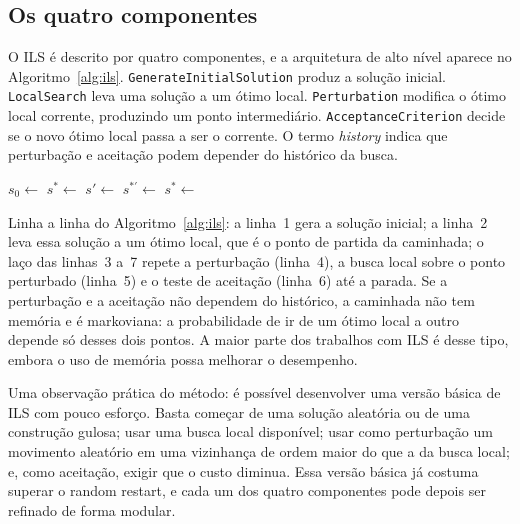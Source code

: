 \documentclass[11pt,a4paper]{article}
\newcommand{\code}[1]{\texttt{#1}}
\begin{document}
\subsection{Os quatro componentes}

O ILS é descrito por quatro componentes, e a arquitetura de alto nível aparece no Algoritmo~\ref{alg:ils}. \code{GenerateInitialSolution} produz a solução inicial. \code{LocalSearch} leva uma solução a um ótimo local. \code{Perturbation} modifica o ótimo local corrente, produzindo um ponto intermediário. \code{AcceptanceCriterion} decide se o novo ótimo local passa a ser o corrente. O termo \emph{history} indica que perturbação e aceitação podem depender do histórico da busca.

\begin{algorithm}[t]
\caption{Iterated Local Search (minimização)}
\label{alg:ils}
\begin{algorithmic}[1]
\State $s_0 \gets$ 
\State $s^\ast \gets$ 
\Repeat
  \State $s' \gets$ 
  \State $s^{\ast\prime} \gets$ 
  \State $s^\ast \gets$ 
\end{algorithmic}
\end{algorithm}

Linha a linha do Algoritmo~\ref{alg:ils}: a linha~1 gera a solução inicial; a linha~2 leva essa solução a um ótimo local, que é o ponto de partida da caminhada; o laço das linhas~3 a~7 repete a perturbação (linha~4), a busca local sobre o ponto perturbado (linha~5) e o teste de aceitação (linha~6) até a parada. Se a perturbação e a aceitação não dependem do histórico, a caminhada não tem memória e é markoviana: a probabilidade de ir de um ótimo local a outro depende só desses dois pontos. A maior parte dos trabalhos com ILS é desse tipo, embora o uso de memória possa melhorar o desempenho.

Uma observação prática do método: é possível desenvolver uma versão básica de ILS com pouco esforço. Basta começar de uma solução aleatória ou de uma construção gulosa; usar uma busca local disponível; usar como perturbação um movimento aleatório em uma vizinhança de ordem maior do que a da busca local; e, como aceitação, exigir que o custo diminua. Essa versão básica já costuma superar o random restart, e cada um dos quatro componentes pode depois ser refinado de forma modular.
\end{document}
